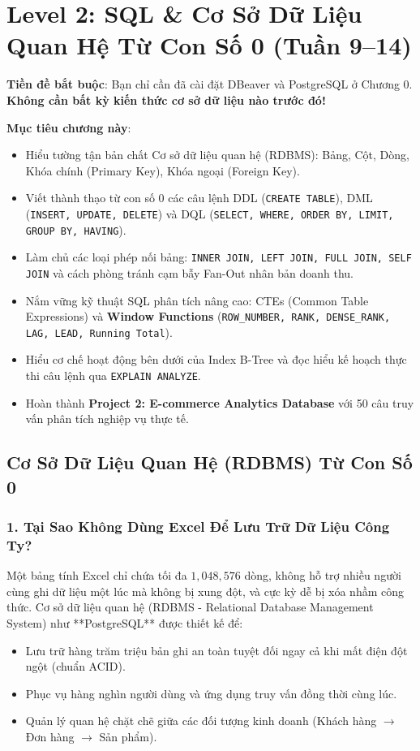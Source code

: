 \chapter{Level 2: SQL \& Cơ Sở Dữ Liệu Quan Hệ Từ Con Số 0 (Tuần 9--14)}

\begin{lythuyetbox}
\textbf{Tiền đề bắt buộc}: Bạn chỉ cần đã cài đặt DBeaver và PostgreSQL ở Chương 0. \textbf{Không cần bất kỳ kiến thức cơ sở dữ liệu nào trước đó!}

\textbf{Mục tiêu chương này}:
\begin{itemize}
    \item Hiểu tường tận bản chất Cơ sở dữ liệu quan hệ (RDBMS): Bảng, Cột, Dòng, Khóa chính (Primary Key), Khóa ngoại (Foreign Key).
    \item Viết thành thạo từ con số 0 các câu lệnh DDL (\texttt{CREATE TABLE}), DML (\texttt{INSERT, UPDATE, DELETE}) và DQL (\texttt{SELECT, WHERE, ORDER BY, LIMIT, GROUP BY, HAVING}).
    \item Làm chủ các loại phép nối bảng: \texttt{INNER JOIN, LEFT JOIN, FULL JOIN, SELF JOIN} và cách phòng tránh cạm bẫy Fan-Out nhân bản doanh thu.
    \item Nắm vững kỹ thuật SQL phân tích nâng cao: CTEs (Common Table Expressions) và \textbf{Window Functions} (\texttt{ROW\_NUMBER, RANK, DENSE\_RANK, LAG, LEAD, Running Total}).
    \item Hiểu cơ chế hoạt động bên dưới của Index B-Tree và đọc hiểu kế hoạch thực thi câu lệnh qua \texttt{EXPLAIN ANALYZE}.
    \item Hoàn thành \textbf{Project 2: E-commerce Analytics Database} với 50 câu truy vấn phân tích nghiệp vụ thực tế.
\end{itemize}
\end{lythuyetbox}

\section{Cơ Sở Dữ Liệu Quan Hệ (RDBMS) Từ Con Số 0}

\subsection{1. Tại Sao Không Dùng Excel Để Lưu Trữ Dữ Liệu Công Ty?}
Một bảng tính Excel chỉ chứa tối đa $1,048,576$ dòng, không hỗ trợ nhiều người cùng ghi dữ liệu một lúc mà không bị xung đột, và cực kỳ dễ bị xóa nhầm công thức. Cơ sở dữ liệu quan hệ (RDBMS - Relational Database Management System) như **PostgreSQL** được thiết kế để:
\begin{itemize}
    \item Lưu trữ hàng trăm triệu bản ghi an toàn tuyệt đối ngay cả khi mất điện đột ngột (chuẩn ACID).
    \item Phục vụ hàng nghìn người dùng và ứng dụng truy vấn đồng thời cùng lúc.
    \item Quản lý quan hệ chặt chẽ giữa các đối tượng kinh doanh (Khách hàng $\rightarrow$ Đơn hàng $\rightarrow$ Sản phẩm).
\end{itemize}

